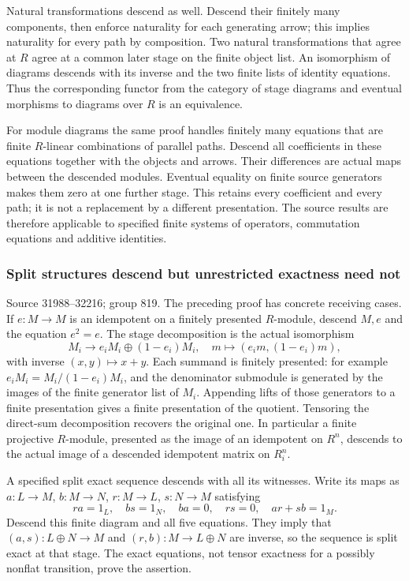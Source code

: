 Natural transformations descend as well. Descend their finitely many components, then enforce naturality for each generating arrow; this implies naturality for every path by composition. Two natural transformations that agree at \(R\) agree at a common later stage on the finite object list. An isomorphism of diagrams descends with its inverse and the two finite lists of identity equations. Thus the corresponding functor from the category of stage diagrams and eventual morphisms to diagrams over \(R\) is an equivalence.

For module diagrams the same proof handles finitely many equations that are finite \(R\)-linear combinations of parallel paths. Descend all coefficients in these equations together with the objects and arrows. Their differences are actual maps between the descended modules. Eventual equality on finite source generators makes them zero at one further stage. This retains every coefficient and every path; it is not a replacement by a different presentation. The source results are therefore applicable to specified finite systems of operators, commutation equations and additive identities.

\subsubsection{Split structures descend but unrestricted exactness need not}\label{algebra-proof-036-split-structures-descend-but-unrestricted-exactness-need-not}

Source 31988--32216; group 819. The preceding proof has concrete receiving cases. If \(e:M\to M\) is an idempotent on a finitely presented \(R\)-module, descend \(M,e\) and the equation \(e^2=e\). The stage decomposition is the actual isomorphism \[
M_i\longrightarrow e_iM_i\oplus(1-e_i)M_i,\quad
m\longmapsto(e_i m,(1-e_i)m),
\] with inverse \((x,y)\mapsto x+y\). Each summand is finitely presented: for example \(e_iM_i=M_i/(1-e_i)M_i\), and the denominator submodule is generated by the images of the finite generator list of \(M_i\). Appending lifts of those generators to a finite presentation gives a finite presentation of the quotient. Tensoring the direct-sum decomposition recovers the original one. In particular a finite projective \(R\)-module, presented as the image of an idempotent on \(R^n\), descends to the actual image of a descended idempotent matrix on \(R_i^n\).

A specified split exact sequence descends with all its witnesses. Write its maps as \(a:L\to M\), \(b:M\to N\), \(r:M\to L\), \(s:N\to M\) satisfying \[
ra=1_L,\quad bs=1_N,\quad ba=0,\quad rs=0,\quad ar+sb=1_M.
\] Descend this finite diagram and all five equations. They imply that \((a,s):L\oplus N\to M\) and \((r,b):M\to L\oplus N\) are inverse, so the sequence is split exact at that stage. The exact equations, not tensor exactness for a possibly nonflat transition, prove the assertion.

